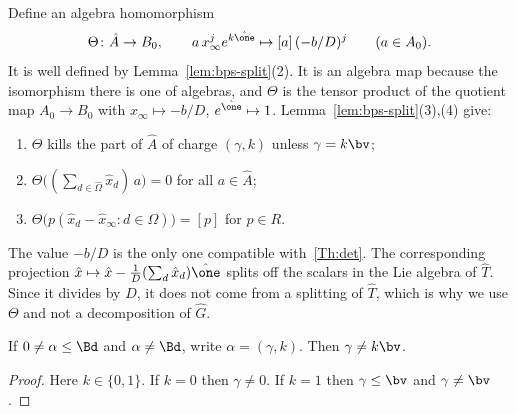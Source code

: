 Define an algebra homomorphism
\[
 \Theta\colon\hat A\to B_0,\qquad a\,x_\infty^je^{k\hat\one}\mapsto[a]\,(-b/D)^j\qquad(a\in A_0).
\]
It is well defined by Lemma~\ref{lem:bps-split}(2).  It is an algebra map
because the isomorphism there is one of algebras, and $\Theta$ is the tensor
product of the quotient map $A_0\to B_0$ with
$x_\infty\mapsto-b/D$, $e^{\hat\one}\mapsto1$.
Lemma~\ref{lem:bps-split}(3),(4) give:
\begin{enumerate}[leftmargin=2.6em,label=($\Theta$\arabic*)]
\item\label{Th:charge} $\Theta$ kills the part of $\hat A$ of charge
$(\gamma,k)$ unless $\gamma=k\bv$;
\item\label{Th:det} $\Theta\big((\sum_{d\in\hat\Omega}\hat x_d)\,a\big)=0$ for all
$a\in\hat A$;
\item\label{Th:coef} $\Theta\big(p(\hat x_d-\hat x_\infty:d\in\Omega)\big)=[p]$ for
$p\in R$.
\end{enumerate}
The value $-b/D$ is the only one compatible with~\ref{Th:det}.  The
corresponding projection $\hat x\mapsto\hat x-\frac1D(\sum_d\hat x_d)\hat\one$
splits off the scalars in the Lie algebra of $\hat T$.  Since it divides by
$D$, it does not come from a splitting of $\hat T$, which is why we use
$\Theta$ and not a decomposition of $\hat G$.

\begin{lemma}\label{lem:bps-charge}
If $0\neq\alpha\le\Bd$ and $\alpha\neq\Bd$, write $\alpha=(\gamma,k)$.  Then
$\gamma\neq k\bv$.
\end{lemma}

\begin{proof}
Here $k\in\{0,1\}$.  If $k=0$ then $\gamma\neq0$.  If $k=1$ then
$\gamma\le\bv$ and $\gamma\neq\bv$.
\end{proof}

